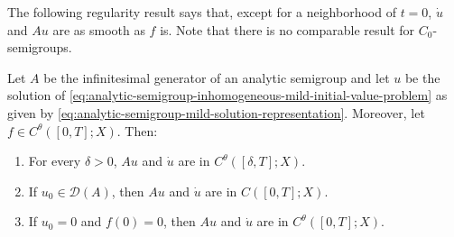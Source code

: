 The following regularity result says that, except for a neighborhood of $t=0$, $\dot u$ and $Au$ are as smooth as $f$ is. Note that there is no comparable result for $C_0$-semigroups.

\begin{Theorem}
\label{thm:analytic-mild-holder-regularity}
Let $A$ be the infinitesimal generator of an analytic semigroup and let $u$ be the solution of \eqref{eq:analytic-semigroup-inhomogeneous-mild-initial-value-problem} as given by \eqref{eq:analytic-semigroup-mild-solution-representation}. Moreover, let $f\in C^\theta([0,T];X)$. Then:\begin{enumerate}\item\label{concl:analytic-mild-regularity-away-from-zero} For every $\delta>0$, $Au$ and $\dot u$ are in $C^\theta([\delta,T];X)$.\item\label{concl:analytic-mild-regularity-continuity-at-zero} If $u_0\in\mathcal{D}(A)$, then $Au$ and $\dot u$ are in $C([0,T];X)$.\item\label{concl:analytic-mild-regularity-zero-compatible-holder} If $u_0=0$ and $f(0)=0$, then $Au$ and $\dot u$ are in $C^\theta([0,T];X)$.\end{enumerate}
\end{Theorem}

